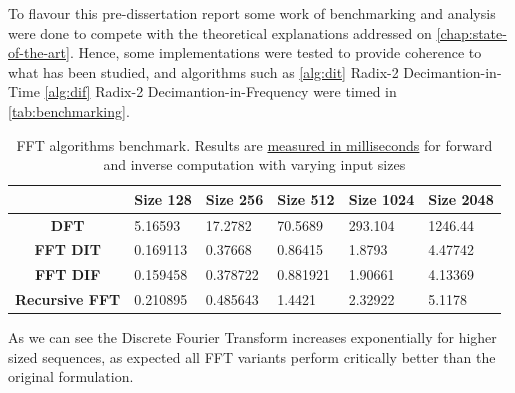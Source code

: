 \documentclass[
  oneside,
  11pt, a4paper,
  footinclude=true,
  headinclude=true,
  cleardoublepage=empty
]{scrbook}
\begin{document}
To flavour this pre-dissertation report some work of benchmarking and analysis were done to compete with the theoretical explanations addressed on \autoref{chap:state-of-the-art}. Hence, some implementations were tested to provide coherence to what has been studied, and algorithms such as \autoref{alg:dit} Radix-2 Decimantion-in-Time \autoref{alg:dif} Radix-2 Decimantion-in-Frequency were timed in \autoref{tab:benchmarking}.

\begin{table}[h]
    \centering
    \normalsize
    \sffamily
    \renewcommand{\arraystretch}{1.5}%
    \begin{tabular}{|c|l|l|l|l|l|}
        \hline
        \multicolumn{1}{|l|}{} & \multicolumn{1}{c|}{\textbf{Size 128}} & \multicolumn{1}{c|}{\textbf{Size 256}} & \multicolumn{1}{c|}{\textbf{Size 512}} & \multicolumn{1}{c|}{\textbf{Size 1024}} & \multicolumn{1}{c|}{\textbf{Size 2048}} \\ \hline
        \textbf{DFT}           & 5.16593                                & 17.2782                                & 70.5689                                & 293.104                                 & 1246.44                                 \\ \hline
        \textbf{FFT  DIT}      & 0.169113                               & 0.37668                                & 0.86415                                & 1.8793                                  & 4.47742                                 \\ \hline
        \textbf{FFT DIF}       & 0.159458                               & 0.378722                               & 0.881921                               & 1.90661                                 & 4.13369                                 \\ \hline
        \textbf{Recursive FFT} & 0.210895                               & 0.485643                               & 1.4421                                 & 2.32922                                 & 5.1178                                  \\ \hline
    \end{tabular}
    \caption{FFT algorithms benchmark. Results are \underline{measured in milliseconds} for forward and inverse computation with varying input sizes}
    \label{tab:benchmarking}
\end{table}

As we can see the Discrete Fourier Transform increases exponentially for higher sized sequences, as expected all FFT variants perform critically better than the original formulation.
\end{document}
